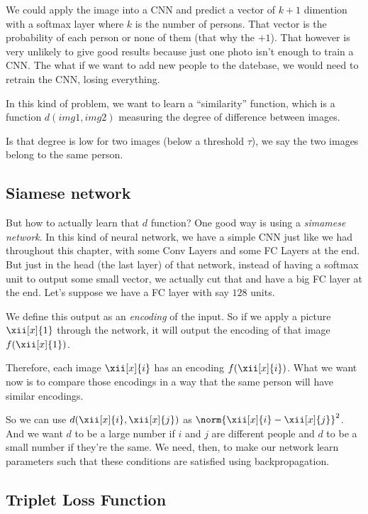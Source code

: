 \documentclass[12pt, a4paper, oneside]{book}
\begin{document}
We could apply the image into a CNN and predict a vector of $k+1$ dimention with
a softmax layer where $k$ is the number of persons. That vector is the
probability of each person or none of them (that why the $+1$). That however is
very unlikely to give good results because just one photo isn't enough to train
a CNN. The what if we want to add new people to the datebase, we would need to
retrain the CNN, losing everything.

In this kind of problem, we want to learn a ``similarity'' function, which is a
function $d(img1, img2)$ measuring the degree of difference between images.

Is that degree is low for two images (below a threshold $\tau$), we say the two
images belong to the same person.

\subsection{Siamese network}%
\label{sub:siamese_network}

But how to actually learn that $d$ function? One good way is using a
\textit{simamese network}. In this kind of neural network, we have a simple CNN
just like we had throughout this chapter, with some Conv Layers and some FC
Layers at the end. But just in the head (the last layer) of that network,
instead of having a softmax unit to output some small vector, we actually cut
that and have a big FC layer at the end. Let's suppose we have a FC layer with
say $128$ units.

We define this output as an \textit{encoding} of the input. So if we apply a
picture $\xii[x]{1}$ through the network, it will output the encoding of that
image $f(\xii[x]{1})$.

Therefore, each image $\xii[x]{i}$ has an encoding $f(\xii[x]{i})$. What we want
now is to compare those encodings in a way that the same person will have
similar encodings.

So we can use $d(\xii[x]{i}, \xii[x]{j})$ as $\norm{\xii[x]{i}-\xii[x]{j}}^2$.
And we want $d$ to be a large number if $i$ and $j$ are different people and $d$
to be a small number if they're the same. We need, then, to make our network
learn parameters such that these conditions are satisfied using backpropagation.

\subsection{Triplet Loss Function}%
\label{sub:triplet_loss_function}
\end{document}
